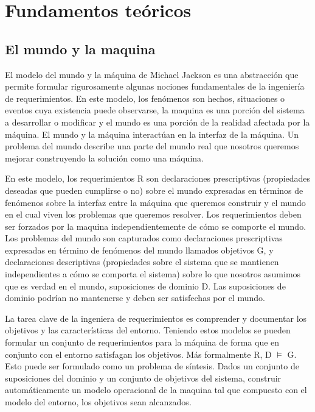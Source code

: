 \chapter{Fundamentos teóricos}

\section{El mundo y la maquina}
El modelo del mundo y la máquina de Michael Jackson es una abstracción que permite formular rigurosamente algunas nociones
fundamentales de la ingeniería de requerimientos. En este modelo, los fenómenos son hechos, situaciones o eventos cuya
existencia puede observarse, la maquina es una porción del sistema a desarrollar o modificar y el mundo es una porción de
la realidad afectada por la máquina. El mundo y la máquina interactúan en la interfaz de la máquina. Un problema del mundo 
describe una parte del mundo real que nosotros queremos mejorar construyendo la solución como una máquina.

\vspace{\baselineskip} 
En este modelo, los requerimientos R son declaraciones prescriptivas (propiedades deseadas que pueden cumplirse o no) sobre 
el mundo expresadas en términos de fenómenos sobre la interfaz entre la máquina que queremos construir y el mundo en el cual 
viven los problemas que queremos resolver. Los requerimientos deben ser forzados por la maquina independientemente de cómo 
se comporte el mundo. Los problemas del mundo son capturados como declaraciones prescriptivas expresadas en término de 
fenómenos del mundo llamados objetivos G, y declaraciones descriptivas (propiedades sobre el sistema que se mantienen 
independientes a cómo se comporta el sistema) sobre lo que nosotros asumimos que es verdad en el mundo, suposiciones 
de dominio D. Las suposiciones de dominio podrían no mantenerse y deben ser satisfechas por el mundo. 

\vspace{\baselineskip}
La tarea clave de la ingeniera de requerimientos es comprender y documentar los objetivos y las características del entorno.
Teniendo estos modelos se pueden formular un conjunto de requerimientos para la máquina de forma que en conjunto con el
entorno satisfagan los objetivos. Más formalmente R, D $\vDash$ G.
Esto puede ser formulado como un problema de síntesis. Dados un conjunto de suposiciones del dominio y un conjunto de
objetivos del sistema, construir  automáticamente un modelo operacional de la maquina tal que compuesto con el modelo del
entorno, los objetivos sean alcanzados.

